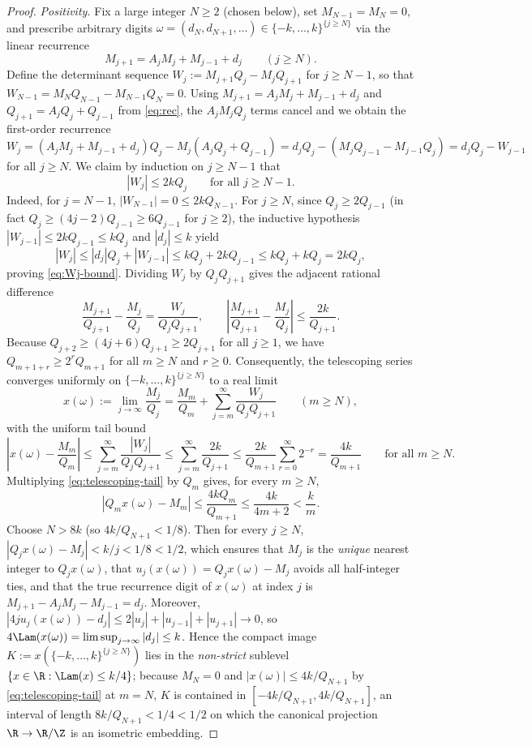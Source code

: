 \begin{proof}
\emph{Positivity.} Fix a large integer $N\ge2$ (chosen below), set
$M_{N-1}=M_N=0$, and prescribe arbitrary digits
$\omega=(d_N,d_{N+1},\dots)\in\{-k,\ldots,k\}^{\{j\ge N\}}$ via the linear
recurrence
\[
M_{j+1}=A_jM_j+M_{j-1}+d_j\qquad(j\ge N).
\]
Define the determinant sequence $W_j:=M_{j+1}Q_j-M_jQ_{j+1}$ for $j\ge N-1$, so
that $W_{N-1}=M_NQ_{N-1}-M_{N-1}Q_N=0$. Using $M_{j+1}=A_jM_j+M_{j-1}+d_j$ and
$Q_{j+1}=A_jQ_j+Q_{j-1}$ from \eqref{eq:rec}, the $A_jM_jQ_j$ terms cancel and
we obtain the first-order recurrence
\[
W_j=(A_jM_j+M_{j-1}+d_j)Q_j-M_j(A_jQ_j+Q_{j-1})
=d_jQ_j-(M_jQ_{j-1}-M_{j-1}Q_j)=d_jQ_j-W_{j-1}
\]
for all $j\ge N$. We claim by induction on $j\ge N-1$ that
\begin{equation}\label{eq:Wj-bound}
|W_j|\le 2kQ_j\qquad\text{for all }j\ge N-1.
\end{equation}
Indeed, for $j=N-1$, $|W_{N-1}|=0\le2kQ_{N-1}$. For $j\ge N$, since $Q_j\ge2Q_{j-1}$
(in fact $Q_j\ge(4j-2)Q_{j-1}\ge6Q_{j-1}$ for $j\ge2$), the inductive
hypothesis $|W_{j-1}|\le2kQ_{j-1}\le kQ_j$ and $|d_j|\le k$ yield
\[
|W_j|\le|d_j|Q_j+|W_{j-1}|\le kQ_j+2kQ_{j-1}\le kQ_j+kQ_j=2kQ_j,
\]
proving \eqref{eq:Wj-bound}. Dividing $W_j$ by $Q_jQ_{j+1}$ gives the adjacent
rational difference
\[
\frac{M_{j+1}}{Q_{j+1}}-\frac{M_j}{Q_j}=\frac{W_j}{Q_jQ_{j+1}},\qquad
\left|\frac{M_{j+1}}{Q_{j+1}}-\frac{M_j}{Q_j}\right|\le\frac{2k}{Q_{j+1}}.
\]
Because $Q_{j+2}\ge(4j+6)Q_{j+1}\ge2Q_{j+1}$ for all $j\ge1$, we have
$Q_{m+1+r}\ge2^r Q_{m+1}$ for all $m\ge N$ and $r\ge0$. Consequently, the
telescoping series converges uniformly on $\{-k,\dots,k\}^{\{j\ge N\}}$ to a
real limit
\[
x(\omega):=\lim_{j\to\infty}\frac{M_j}{Q_j}
=\frac{M_m}{Q_m}+\sum_{j=m}^\infty\frac{W_j}{Q_jQ_{j+1}}\qquad(m\ge N),
\]
with the uniform tail bound
\begin{equation}\label{eq:telescoping-tail}
\left|x(\omega)-\frac{M_m}{Q_m}\right|
\le\sum_{j=m}^\infty\frac{|W_j|}{Q_jQ_{j+1}}
\le\sum_{j=m}^\infty\frac{2k}{Q_{j+1}}
\le\frac{2k}{Q_{m+1}}\sum_{r=0}^\infty 2^{-r}
=\frac{4k}{Q_{m+1}}\qquad\text{for all }m\ge N.
\end{equation}
Multiplying \eqref{eq:telescoping-tail} by $Q_m$ gives, for every $m\ge N$,
\[
|Q_mx(\omega)-M_m|\le\frac{4kQ_m}{Q_{m+1}}\le\frac{4k}{4m+2}<\frac{k}{m}.
\]
Choose $N>8k$ (so $4k/Q_{N+1}<1/8$). Then for every $j\ge N$,
$|Q_jx(\omega)-M_j|<k/j<1/8<1/2$, which ensures that $M_j$ is the \emph{unique}
nearest integer to $Q_jx(\omega)$, that $u_j(x(\omega))=Q_jx(\omega)-M_j$ avoids
all half-integer ties, and that the true recurrence digit of $x(\omega)$ at
index $j$ is $M_{j+1}-A_jM_j-M_{j-1}=d_j$. Moreover,
$|4ju_j(x(\omega))-d_j|\le2|u_j|+|u_{j-1}|+|u_{j+1}|\to0$, so
$4\Lam(x(\omega))=\limsup_{j\to\infty}|d_j|\le k$. Hence the compact image
$K:=x(\{-k,\dots,k\}^{\{j\ge N\}})$ lies in the \emph{non-strict} sublevel
$\{x\in\R:\Lam(x)\le k/4\}$; because $M_N=0$ and $|x(\omega)|\le4k/Q_{N+1}$ by
\eqref{eq:telescoping-tail} at $m=N$, $K$ is contained in
$[-4k/Q_{N+1},4k/Q_{N+1}]$, an interval of length $8k/Q_{N+1}<1/4<1/2$ on which
the canonical projection $\R\to\R/\Z$ is an isometric embedding.


\end{proof}
